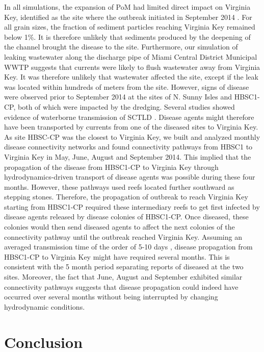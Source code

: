 \documentclass[preprint,12pt,authoryear]{elsarticle}
\begin{document}
In all simulations, the expansion of PoM had limited direct impact on Virginia Key, identified as the site where the outbreak initiated in September 2014 \cite{precht2016unprecedented}. For all grain sizes, the fraction of sediment particles reaching Virginia Key remained below 1\%. It is therefore unlikely that sediments produced by the deepening of the channel brought the disease to the site. Furthermore, our simulation of leaking wastewater along the discharge pipe of Miami Central District Municipal WWTP suggests that currents were likely to flush wastewater away from Virginia Key. It was therefore unlikely that wastewater affected the site, except if the leak was located within hundreds of meters from the site. However, signs of disease were observed prior to September 2014 at the sites of N. Sunny Isles and HBSC1-CP, both of which were impacted by the dredging. Several studies showed evidence of waterborne transmission of SCTLD \citep{aeby2019pathogenesis,dobbelaere2020coupled,eaton2021measuring,meiling2021variable}. Disease agents might therefore have been transported by currents from one of the diseased sites to Virginia Key. As site HBSC-CP was the closest to Virginia Key, we built and analyzed monthly disease connectivity networks and found connectivity pathways from HBSC1 to Virginia Key in May, June, August and September 2014. This implied that the propagation of the disease from HBSC1-CP to Virginia Key through hydrodynamics-driven transport of disease agents was possible during these four months. However, these pathways used reefs located further southward as stepping stones. Therefore, the propagation of outbreak to reach Virginia Key starting from HBSC1-CP required these intermediary reefs to get first infected by disease agents released by disease colonies of HBSC1-CP. Once diseased, these colonies would then send diseased agents to affect the next colonies of the connectivity pathway until the outbreak reached Virginia Key. Assuming an averaged transmission time of the order of 5-10 days \citep{dobbelaere2020coupled}, disease propagation from HBSC1-CP to Virginia Key might have required several months. This is consistent with the 5 month period separating reports of diseased at the two sites. Moreover, the fact that June, August and September exhibited similar connectivity pathways suggests that disease propagation could indeed have occurred over several months without being interrupted by changing hydrodynamic conditions.

\section{Conclusion}
\end{document}
